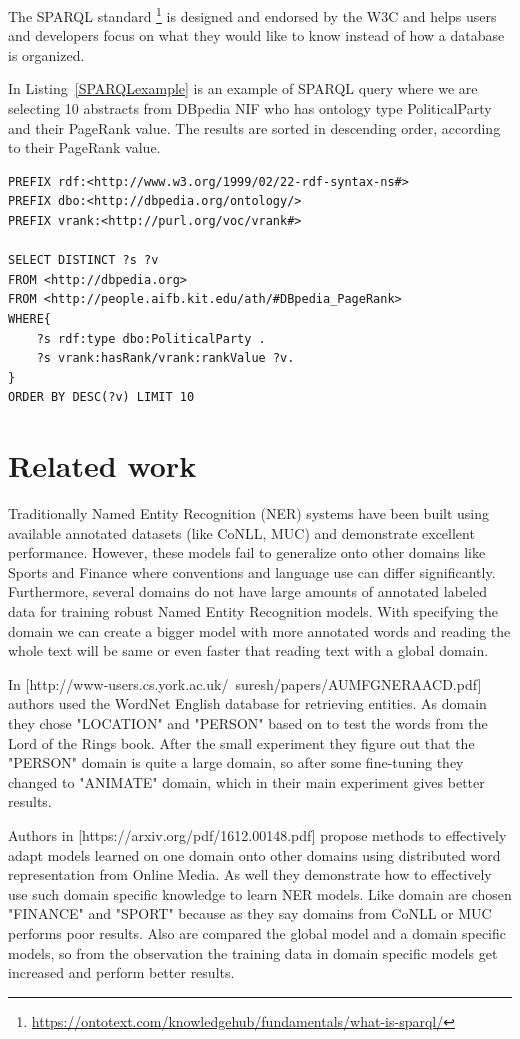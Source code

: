 \documentclass[thesis=M,english]{FITthesis}[2018/05/30]
\begin{document}
	The SPARQL standard \footnote{\url{https://ontotext.com/knowledgehub/fundamentals/what-is-sparql/}} is designed and endorsed by the W3C and helps users and developers focus on what they would like to know instead of how a database is organized.

	In Listing~\ref{SPARQLexample} is an example of SPARQL query where we are selecting 10 abstracts from DBpedia NIF who has ontology type PoliticalParty and their PageRank value. The results are sorted in descending order, according to their PageRank value.   
	
\begin{lstlisting}[caption=SPARQL example \label{SPARQLexample},captionpos=b]
PREFIX rdf:<http://www.w3.org/1999/02/22-rdf-syntax-ns#>
PREFIX dbo:<http://dbpedia.org/ontology/>
PREFIX vrank:<http://purl.org/voc/vrank#>

SELECT DISTINCT ?s ?v
FROM <http://dbpedia.org>
FROM <http://people.aifb.kit.edu/ath/#DBpedia_PageRank>
WHERE{
	?s rdf:type dbo:PoliticalParty .
	?s vrank:hasRank/vrank:rankValue ?v.
}
ORDER BY DESC(?v) LIMIT 10
\end{lstlisting}

\section{Related work}
	Traditionally Named Entity Recognition (NER)\cite{article:DomainSpecific} systems have been built using available annotated datasets (like CoNLL, MUC) and demonstrate excellent performance. However, these models fail to generalize onto other domains like Sports and Finance where conventions and language use can differ significantly. Furthermore, several domains do not have large amounts of annotated labeled data for training robust Named Entity Recognition models.
With specifying the domain we can create a bigger model with more annotated words and reading the whole text will be same or even faster that reading text with a global domain.  

	In [http://www-users.cs.york.ac.uk/~suresh/papers/AUMFGNERAACD.pdf] authors used the WordNet English database for retrieving entities. As domain they chose "LOCATION" and "PERSON" based on to test the words from the Lord of the Rings book. After the small experiment they figure out that the "PERSON" domain is quite a large domain, so after some fine-tuning they changed to "ANIMATE" domain, which in their main experiment gives better results.

	Authors in [https://arxiv.org/pdf/1612.00148.pdf] propose methods to effectively adapt models learned on one domain onto other domains using distributed word representation from Online Media. As well they demonstrate how to effectively use such domain specific knowledge to learn NER models. Like domain are chosen "FINANCE" and "SPORT" because as they say domains from CoNLL or MUC performs poor results. Also are compared the global model and a domain specific models, so from the observation the training data in domain specific models get increased and perform better results.
 
\end{document}
